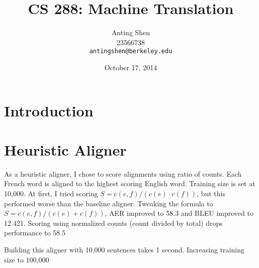 \documentclass[11pt]{article}
\title{CS 288: Machine Translation}
\author{Anting Shen \\
  23566738 \\
  {\tt antingshen@berkeley.edu} \\
}
\date{October 17, 2014}
\begin{document}
\maketitle

\section{Introduction}


\section{Heuristic Aligner}

As a heuristic aligner, I chose to score alignments using ratio of counts. Each French word
is aligned to the highest scoring English word. Training size is set at 10,000.
At first, I tried scoring $S = c(e, f) / (c(e) \cdot c(f))$, but this performed worse than the
baseline aligner. Tweaking the formula to $S = c(e, f) / (c(e) + c(f))$, AER improved to 58.3%
and BLEU improved to 12.421. Scoring using normalized counts (count divided by total) drops
performance to 58.5%

Building this aligner with 10,000 sentences takes 1 second. Increasing training size to 100,000
\end{document}
